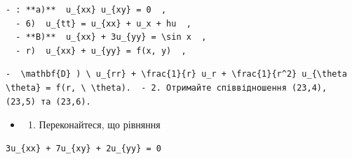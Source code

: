 \documentclass[
  ukrainian,
]{article}
\providecommand{\tightlist}{%
  \setlength{\itemsep}{0pt}\setlength{\parskip}{0pt}}
\begin{document}
\begin{verbatim}
- : **a)**  u_{xx} u_{xy} = 0  ,
  - 6)  u_{tt} = u_{xx} + u_x + hu  ,
  - **B)**  u_{xx} + 3u_{yy} = \sin x  ,
  - r)  u_{xx} + u_{yy} = f(x, y)  ,
\end{verbatim}

\begin{verbatim}
-  \mathbf{D} ) \ u_{rr} + \frac{1}{r} u_r + \frac{1}{r^2} u_{\theta \theta} = f(r, \ \theta).  - 2. Отримайте співвідношення (23,4), (23,5) та (23,6).
\end{verbatim}

\begin{itemize}
\tightlist
\item
  \begin{enumerate}
  \def\labelenumi{\arabic{enumi}.}
  \setcounter{enumi}{2}
  \tightlist
  \item
    Переконайтеся, що рівняння
  \end{enumerate}
\end{itemize}

\begin{verbatim}
3u_{xx} + 7u_{xy} + 2u_{yy} = 0
\end{verbatim}
\end{document}
